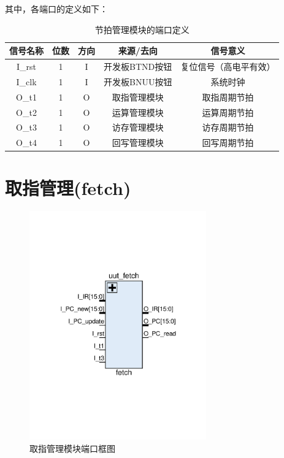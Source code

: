 \documentclass[forprint]{WHUBachelor}
\begin{document}
其中，各端口的定义如下：

\begin{table}[ht]
  \centering
  \begin{tabular}{c c c c c}
    \hline
    信号名称 & 位数 & 方向 & 来源/去向 & 信号意义 \\
    \hline
    I\_rst & 1 & I & 开发板BTND按钮 & 复位信号（高电平有效）\\
    I\_clk & 1 & I & 开发板BNUU按钮 & 系统时钟 \\
    O\_t1 & 1 & O & 取指管理模块 & 取指周期节拍 \\
    O\_t2 & 1 & O & 运算管理模块 & 运算周期节拍 \\
    O\_t3 & 1 & O & 访存管理模块 & 访存周期节拍 \\
    O\_t4 & 1 & O & 回写管理模块 & 回写周期节拍 \\
    \hline
  \end{tabular}
  \caption{节拍管理模块的端口定义}
  \label{tab:ports:mod4}
\end{table}

\section{取指管理(fetch)}

\begin{figure}[H]
  \centering
  \includegraphics[width=3in]{figures/ports/fetch.pdf}
  \caption{取指管理模块端口框图}
  \label{fig:ports:fetch}
\end{figure}
\end{document}
